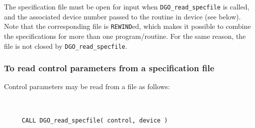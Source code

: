 \documentclass{galahad}
\newcommand{\packagename}{DGO}
\begin{document}
The specification file must be open for
input when {\tt \packagename\_read\_specfile}
is called, and the associated device number
passed to the routine in device (see below).
Note that the corresponding
file is {\tt REWIND}ed, which makes it possible to combine the specifications
for more than one program/routine.  For the same reason, the file is not
closed by {\tt \packagename\_read\_specfile}.

\subsubsection{To read control parameters from a specification file}
\label{readspec}

Control parameters may be read from a file as follows:
\hskip0.5in
\def\baselinestretch{0.8} {\tt
\begin{verbatim}
     CALL DGO_read_specfile( control, device )
\end{verbatim}
}
\def\baselinestretch{1.0}
\end{document}
